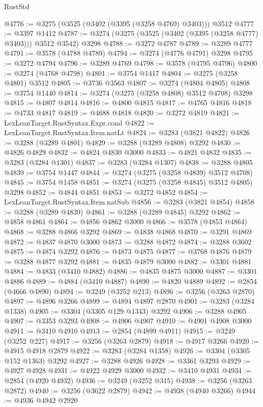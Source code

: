 \begin{lexlean}{RustStd}
\begin{coremodule}
@4776 := @3275 (@3525 (@3402 (@3395 (@3258 @4769) @3403))) @3512
@4777 := @3397 @1412
@4787 := @3274 (@3275 (@3525 (@3402 (@3395 (@3258 @4777) @3403))) @3512 @3542) @3298
@4788 := @3272 @4787
@4789 := @3289 @4777
@4791 := @3578 (@4788 @4789)
@4794 := @3274 (@4776 @4791) @3298
@4795 := @3272 @4794
@4796 := @3289 @4769
@4798 := @3578 (@4795 @4796)
@4800 := @3274 (@4768 @4798)
@4801 := @3754 @1417
@4804 := @3275 (@3258 @4801) @3512
@4805 := @3736 @3563
@4807 := @3274 (@4804 @4805)
@4808 := @3754 @1440
@4814 := @3274 (@3275 (@3258 @4808) @3512 @4708) @3298
@4815 := @4807 @4814
@4816 := @4800 @4815
@4817 := @4765 @4816
@4818 := @4733 @4817
@4819 := @4688 @4818
@4820 := @3272 @4819
@4821 := LexLeanTarget.RustSyntax.Expr.cond
@4822 := LexLeanTarget.RustSyntax.Item.natLt
@4824 := @3283 (@3821 @4822)
@4826 := @3288 (@3289 @4801)
@4829 := @3288 (@3289 @4808) @3292
@4830 := @4826 @4829
@4832 := @4824 @4830 @3000
@4833 := @4821 @4832
@4835 := @3283 (@3284 @1301)
@4837 := @3283 (@3284 @1307)
@4838 := @3288 @4805
@4839 := @3754 @1447
@4844 := @3274 (@3275 (@3258 @4839) @3512 @4708)
@4845 := @3754 @1458
@4851 := @3274 (@3275 (@3258 @4845) @3512 @4805) @3298
@4852 := @4844 @4851
@4853 := @3272 @4852
@4854 := LexLeanTarget.RustSyntax.Item.natSub
@4856 := @3283 (@3821 @4854)
@4858 := @3288 (@3289 @4839)
@4861 := @3288 (@3289 @4845) @3292
@4862 := @4858 @4861
@4864 := @4856 @4862 @3000
@4866 := @3578 (@4853 @4864)
@4868 := @3288 @4866 @3292
@4869 := @4838 @4868
@4870 := @3291 @4869
@4872 := @4837 @4870 @3000
@4873 := @3288 @4872
@4874 := @3288 @3602
@4875 := @4874 @3292
@4876 := @4873 @4875
@4877 := @3768 @4876
@4879 := @3288 @4877 @3292
@4881 := @4835 @4879 @3000
@4882 := @3301 @4881
@4884 := @4833 (@3410 @4882)
@4886 := @4835 @4875 @3000
@4887 := @3301 @4886
@4889 := @4884 (@3410 @4887)
@4890 := @4820 @4889
@4892 := @2854 (@4666 @4890)
@4894 := @3249 (@3252 @213)
@4896 := @3256 (@3263 @2870)
@4897 := @4896 @3266
@4899 := @4894 @4897 @2870
@4901 := @3283 (@3284 @1338)
@4905 := @3304 (@3305 @129 @1343) @3292
@4906 := @3288 @4905
@4907 := @3353 @3293
@4908 := @4906 @4907
@4910 := @4901 @4908 @3000
@4911 := @3410 @4910
@4913 := @2854 (@4899 @4911)
@4915 := @3249 (@3252 @227)
@4917 := @3256 (@3263 @2879)
@4918 := @4917 @3266
@4920 := @4915 @4918 @2879
@4922 := @3283 (@3284 @1358)
@4926 := @3304 (@3305 @152 @1363) @3292
@4927 := @3288 @4926
@4928 := @3361 @3293
@4929 := @4927 @4928
@4931 := @4922 @4929 @3000
@4932 := @3410 @4931
@4934 := @2854 (@4920 @4932)
@4936 := @3249 (@3252 @315)
@4938 := @3256 (@3263 @2872)
@4940 := @3256 (@3622 @2879)
@4942 := @4938 (@4940 @3266)
@4944 := @4936 @4942 @2920

\end{coremodule}
\end{lexlean}
